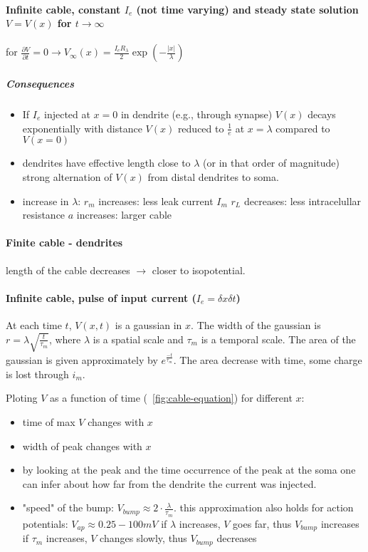 \documentclass[main]{subfiles}
\begin{document}
\paragraph{Infinite cable, constant $I_e$ (not time varying) and steady state solution $V=V(x)$ for $t \to \infty$}
for $\frac{\partial V}{\partial t} = 0 \rightarrow V_\infty (x) = \frac{I_e R_\lambda}{2}\exp(-\frac{|x|}{\lambda})$

\subparagraph{Consequences}
\begin{itemize}
\item  If $I_e$ injected at $x = 0$ in dendrite (e.g., through synapse)
\subitem $V(x)$ decays exponentially with distance
\subitem $V(x)$ reduced to $\frac{1}{e}$ at $x = \lambda$ compared to $V(x = 0)$
\item dendrites have effective length close to $\lambda$ (or in that order of magnitude)
\subitem strong alternation of $V(x)$ from distal dendrites to soma.
\item increase in $\lambda$:
\subitem $r_m$ increases: less leak current $I_m$
\subitem $r_L$ decreases: less intracelullar resistance
\subitem $a$ increases: larger cable
\end{itemize}

\paragraph{Finite cable - dendrites}
length of the cable decreases $\rightarrow$ closer to isopotential.

\paragraph{Infinite cable, pulse of input current ($I_e = \delta x \delta t$)}
At each time $t$, $V(x,t)$ is a gaussian in $x$.
The width of the gaussian is $r  = \lambda \sqrt{\frac{t}{\tau_m}}$, where $\lambda$ is a spatial scale and $\tau_m$ is a temporal scale.
The area of the gaussian is given approximately by $e^\frac{-t}{\tau_m}$. The area decrease with time, some charge is lost through $i_m$.

Ploting $V$ as a function of time (~\ref{fig:cable-equation}) for different $x$:
\begin{itemize}
\item time of max $V$ changes with $x$
\item width of peak changes with $x$
\item by looking at the peak and the time occurrence of the peak at the soma one can infer about how far from the dendrite the current was injected.
\item "speed" of the bump: $V_{bump} \approx 2 \cdot \frac{\lambda}{\tau_m}$.
\subitem this approximation also holds for action potentials: $V_{ap} \approx 0.25 -100 mV$
\subitem if $\lambda$ increases, $V$ goes far, thus $V_{bump}$ increases
\subitem if $\tau_m$ increases, $V$ changes slowly, thus $V_{bump}$ decreases
\end{itemize}
\end{document}
